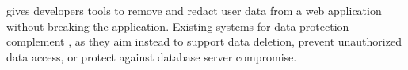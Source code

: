 %

%
\sys gives developers tools to remove and redact user data from a web
application without breaking the application.
%
Existing systems for data protection complement \sys, as they aim instead to
support data deletion, prevent unauthorized data access, or protect against
database server compromise.
%

